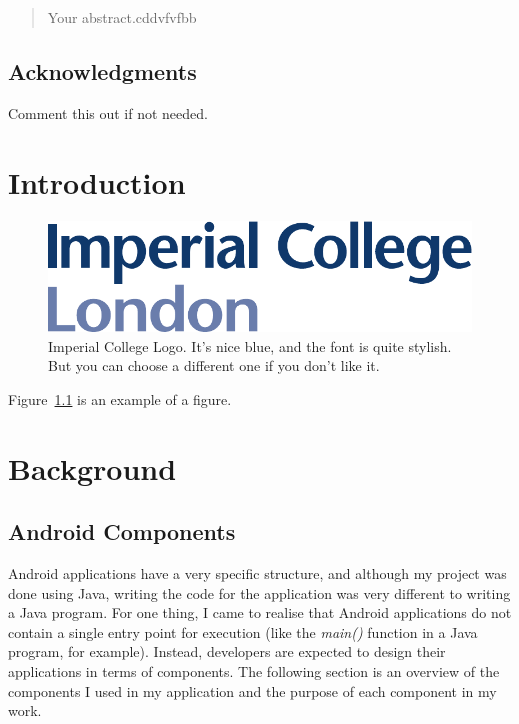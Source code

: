 \documentclass[12pt,twoside]{report}
\date{August 2019}
\begin{document}



\clearpage{\pagestyle{empty}\cleardoublepage}
\setcounter{page}{1}
\pagestyle{fancy}

\begin{abstract}
Your abstract.cddvfvfbb\cite{wood1984spelunking}


\end{abstract}

\cleardoublepage
\section*{Acknowledgments}
Comment this out if not needed.

\clearpage{\pagestyle{empty}\cleardoublepage}

\tableofcontents 


\clearpage{\pagestyle{empty}\cleardoublepage}
\setcounter{page}{1}
\fancyhead[LE,RO]{\slshape \rightmark}
\fancyhead[LO,RE]{\slshape \leftmark}

\chapter{Introduction}

\begin{figure}[tb]
\centering
\includegraphics[width = 0.4\hsize]{./figures/imperial}
\caption{Imperial College Logo. It's nice blue, and the font is quite stylish. But you can choose a different one if you don't like it.}
\label{fig:logo}
\end{figure}

Figure~\ref{fig:logo} is an example of a figure. 

\chapter{Background}
\section{Android Components}
Android applications have a very specific structure, and although my project was done using Java, writing the code for the application was very different to writing a Java program. For one thing, I came to realise that Android applications do not contain a single entry point for execution (like the \textit{main()} function in a Java program, for example). Instead, developers are expected to design their applications in terms of components. The following section is an overview of the components I used in my application and the purpose of each component in my work.
\end{document}
